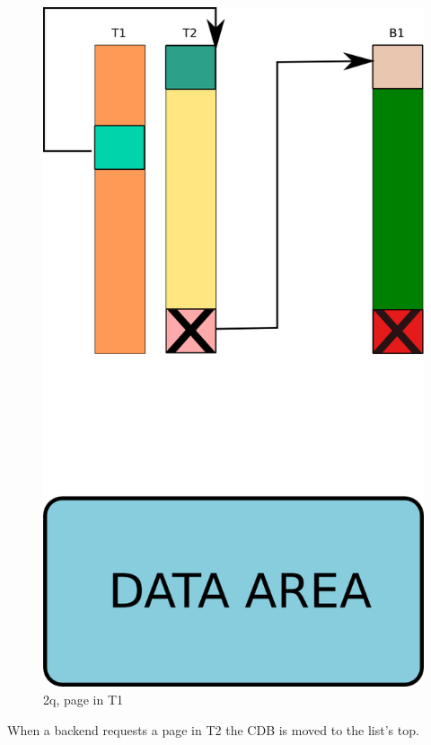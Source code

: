 \begin{figure}[H]
\includegraphics[scale=0.4]{images/2q_02.png}

\caption{2q, page in T1}

\end{figure}

When a backend requests a page in T2 the CDB is moved to the list's top.\newline

